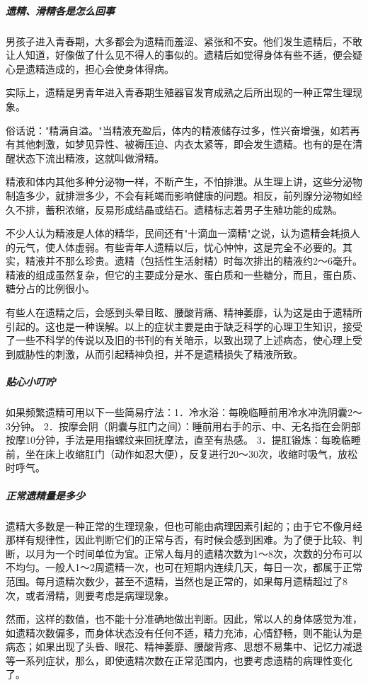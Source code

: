 \begin{enumerate}
\subparagraph{遗精、滑精各是怎么回事}

男孩子进入青春期，大多都会为遗精而羞涩、紧张和不安。他们发生遗精后，不敢让人知道，好像做了什么见不得人的事似的。遗精后如觉得身体有些不适，便会疑心是遗精造成的，担心会使身体得病。

实际上，遗精是男青年进入青春期生殖器官发育成熟之后所出现的一种正常生理现象。

俗话说："精满自溢。"当精液充盈后，体内的精液储存过多，性兴奋增强，如若再有其他刺激，如梦见异性、被褥压迫、内衣太紧等，即会发生遗精。也有的是在清醒状态下流出精液，这就叫做滑精。

精液和体内其他多种分泌物一样，不断产生，不怕排泄。从生理上讲，这些分泌物制造多少，就排泄多少，不会有耗竭而影响健康的问题。相反，前列腺分泌物如经久不排，蓄积浓缩，反易形成结晶或结石。遗精标志着男子生殖功能的成熟。

不少人认为精液是人体的精华，民间还有"十滴血一滴精"之说，认为遗精会耗损人的元气，使人体虚弱。有些青年人遗精以后，忧心忡忡，这是完全不必要的。其实，精液并不那么珍贵。遗精（包括性生活射精）时每次排出的精液约2～6毫升。精液的组成虽然复杂，但它的主要成分是水、蛋白质和一些糖分，而且，蛋白质、糖分占的比例很小。

有些人在遗精之后，会感到头晕目眩、腰酸背痛、精神萎靡，认为这是由于遗精所引起的。这也是一种误解。以上的症状主要是由于缺乏科学的心理卫生知识，接受了一些不科学的传说以及旧的书刊的有关暗示，以致出现了上述病态，使心理上受到威胁性的刺激，从而引起精神负担，并不是遗精损失了精液所致。

\subparagraph{贴心小叮咛}

如果频繁遗精可用以下一些简易疗法：1．冷水浴：每晚临睡前用冷水冲洗阴囊2～3分钟。
2．按摩会阴（阴囊与肛门之间）：睡前用右手的示、中、无名指在会阴部按摩10分钟，手法是用指螺纹来回抚摩法，直至有热感。
3．提肛锻炼：每晚临睡前，坐在床上收缩肛门（动作如忍大便），反复进行20～30次，收缩时吸气，放松时呼气。

\subparagraph{正常遗精量是多少}

遗精大多数是一种正常的生理现象，但也可能由病理因素引起的；由于它不像月经那样有规律性，因此判断它们的正常与否，有时候会感到困难。为了便于比较、判断，以月为一个时间单位为宜。正常人每月的遗精次数为1～8次，次数的分布可以不均匀。一般人1～2周遗精一次，也可在短期内连续几天，每日一次，都属于正常范围。每月遗精次数少，甚至不遗精，当然也是正常的，如果每月遗精超过了8次，或者滑精，则要考虑是病理现象。

然而，这样的数值，也不能十分准确地做出判断。因此，常以人的身体感觉为准，如遗精次数偏多，而身体状态没有任何不适，精力充沛，心情舒畅，则不能认为是病态；如果出现了头昏、眼花、精神萎靡、腰酸背疼、思想不易集中、记忆力减退等一系列症状，那么，即使遗精次数在正常范围内，也要考虑遗精的病理性变化了。


\end{enumerate}
